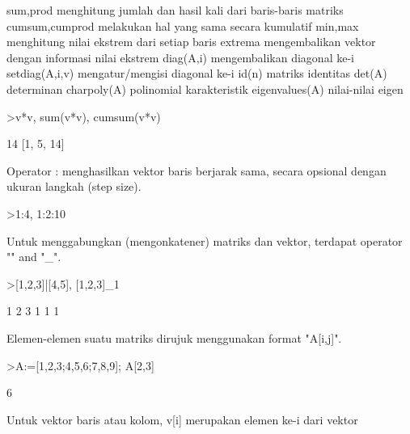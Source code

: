 \documentclass{article}
\newenvironment{eulernotebook}{\par}{\par}
\newenvironment{eulercomment}{\par\medskip}{\par\medskip}
\begin{document}
\begin{eulernotebook}
\begin{eulercomment}
\begin{eulercomment}
\begin{eulercomment}
\begin{eulercomment}
\begin{eulercomment}
\begin{eulercomment}
\begin{eulercomment}
\end{eulercomment}
\begin{eulerttcomment}
  sum,prod menghitung jumlah dan hasil kali dari baris-baris matriks
  cumsum,cumprod melakukan hal yang sama secara kumulatif
  min,max menghitung nilai ekstrem dari setiap baris
  extrema mengembalikan vektor dengan informasi nilai ekstrem
  diag(A,i) mengembalikan diagonal ke-i
  setdiag(A,i,v) mengatur/mengisi diagonal ke-i
  id(n) matriks identitas
  det(A) determinan
  charpoly(A) polinomial karakteristik
  eigenvalues(A) nilai-nilai eigen
\end{eulerttcomment}
\begin{eulerprompt}
>v*v, sum(v*v), cumsum(v*v)
\end{eulerprompt}
\begin{euleroutput}
  [1,  4,  9]
  14
  [1,  5,  14]
\end{euleroutput}
\begin{eulercomment}
Operator : menghasilkan vektor baris berjarak sama, secara opsional
dengan ukuran langkah (step size).
\end{eulercomment}
\begin{eulerprompt}
>1:4, 1:2:10
\end{eulerprompt}
\begin{euleroutput}
  [1,  2,  3,  4]
  [1,  3,  5,  7,  9]
\end{euleroutput}
\begin{eulercomment}
Untuk menggabungkan (mengonkatener) matriks dan vektor, terdapat
operator "\textbar{}" and "\_".
\end{eulercomment}
\begin{eulerprompt}
>[1,2,3]|[4,5], [1,2,3]_1
\end{eulerprompt}
\begin{euleroutput}
  [1,  2,  3,  4,  5]
              1             2             3 
              1             1             1 
\end{euleroutput}
\begin{eulercomment}
Elemen-elemen suatu matriks dirujuk menggunakan format "A[i,j]".
\end{eulercomment}
\begin{eulerprompt}
>A:=[1,2,3;4,5,6;7,8,9]; A[2,3]
\end{eulerprompt}
\begin{euleroutput}
  6
\end{euleroutput}
\begin{eulercomment}
Untuk vektor baris atau kolom, v[i] merupakan elemen ke-i dari vektor

\end{eulercomment}
\end{eulercomment}
\end{eulercomment}
\end{eulercomment}
\end{eulercomment}
\end{eulercomment}
\end{eulercomment}
\end{eulernotebook}
\end{document}
